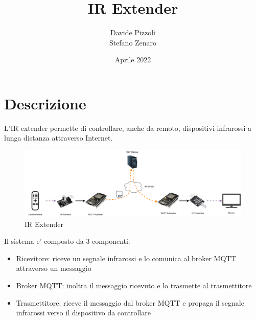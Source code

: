 \documentclass[a4paper,11pt]{article}
\begin{document}
\title{IR Extender}
\author{Davide Pizzoli \\ Stefano Zenaro}
\date{Aprile 2022}


\begin{titlepage}
  \maketitle
  \thispagestyle{empty}
\end{titlepage}

\tableofcontents
{}
\clearpage


\section{Descrizione}

    L'IR extender permette di controllare, anche da remoto, dispositivi infrarossi a lunga distanza attraverso Internet.

    \begin{figure}[H]
      \centering
      \includegraphics[width=\textwidth,height=\textheight,keepaspectratio]{assets/ir_extender}
      \caption{IR Extender}
    \end{figure}

    Il sistema e' composto da 3 componenti:
    \begin{itemize}
        \item Ricevitore: riceve un segnale infrarossi e lo comunica al broker MQTT attraverso un messaggio
        \item Broker MQTT: inoltra il messaggio ricevuto e lo trasmette al trasmettitore
        \item Trasmettitore: riceve il messaggio dal broker MQTT e propaga il segnale infrarossi verso il dispositivo da controllare
    \end{itemize}

\end{document}

